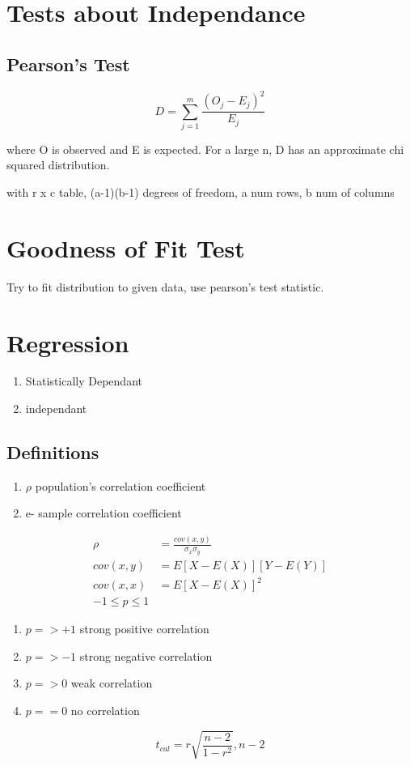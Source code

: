 \documentclass[11pt]{article}
\begin{document}
\section{Tests about Independance}
\subsection{Pearson's Test}
\begin{equation}
  D  = \sum_{j=1}^m\frac{(O_j - E_j)^2}{E_j}
\end{equation}
\par where O is observed and E is expected. For a large n, D has an approximate
chi squared distribution.
\par with r x c table, (a-1)(b-1) degrees of freedom, a num rows, b num of columns
\section{Goodness of Fit Test}
\par Try to fit distribution to given data, use pearson's test statistic.
\section{Regression}
\begin{enumerate}
  \item Statistically Dependant
  \item independant
\end{enumerate}
\subsection{Definitions}
\begin{enumerate}
  \item $\rho$ population's correlation coefficient
  \item e- sample correlation coefficient
\end{enumerate}
\begin{align*}
  \rho &= \frac{cov(x,y)}{\sigma_x\sigma_y}\\
  cov(x,y) &= E[X-E(X)][Y-E(Y)]\\
  cov(x,x) &= E[X-E(X)]^2\\
  -1\le p \le 1
\end{align*}
\begin{enumerate}
  \item $p => +1$ strong positive correlation
  \item $p => -1$ strong negative correlation
  \item $p => 0$ weak correlation
  \item $p == 0$ no correlation
\end{enumerate}
\begin{equation}
  t_{cal} = r \sqrt{\frac{n-2}{1-r^2}}, n-2
\end{equation}
\end{document}
